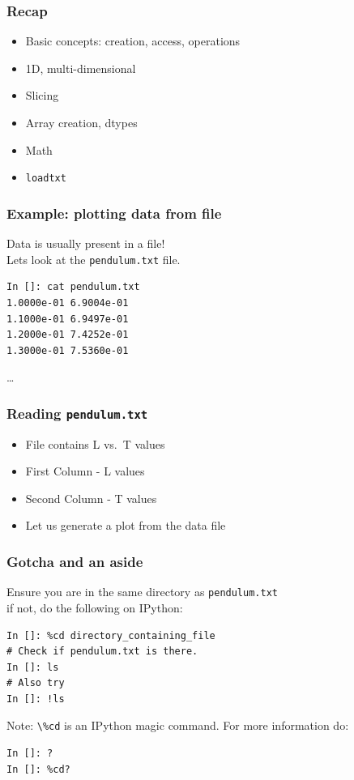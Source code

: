\documentclass[14pt,compress]{beamer}
\newcounter{time}
\newcommand{\inctime}[1]{\addtocounter{time}{#1}{\tiny \thetime\ m}}
\newcommand{\typ}[1]{\lstinline{#1}}
\begin{document}
\begin{frame}[fragile]
  \frametitle{Recap}
  \begin{itemize}
      \item Basic concepts: creation, access, operations
      \item 1D, multi-dimensional
      \item Slicing
      \item Array creation, dtypes
      \item Math
      \item \typ{loadtxt}
      \end{itemize}
      \inctime{5}
\end{frame}

\begin{frame}[fragile]
\frametitle{Example: plotting data from file}
\alert{Data is usually present in a file!} \\
Lets look at the \typ{pendulum.txt} file.
\begin{lstlisting}
In []: cat pendulum.txt
1.0000e-01 6.9004e-01
1.1000e-01 6.9497e-01
1.2000e-01 7.4252e-01
1.3000e-01 7.5360e-01
\end{lstlisting}
\ldots
\end{frame}

\begin{frame}[fragile]
\frametitle{Reading \typ{pendulum.txt}}
\begin{itemize}
  \item File contains L vs.\ T values
  \item First Column - L values
  \item Second Column - T values
  \item Let us generate a plot from the data file
\end{itemize}
\end{frame}

\begin{frame}[fragile]
    \frametitle{Gotcha and an aside}
    Ensure you are in the same directory as \typ{pendulum.txt}\\
    if not, do the following on IPython:
    \begin{lstlisting}
In []: %cd directory_containing_file
# Check if pendulum.txt is there.
In []: ls
# Also try
In []: !ls
    \end{lstlisting}

    \alert{Note:} \typ{\%cd} is an IPython magic command.  For more information
    do:
    \begin{lstlisting}
In []: ?
In []: %cd?
    \end{lstlisting}
\end{frame}
\end{document}
